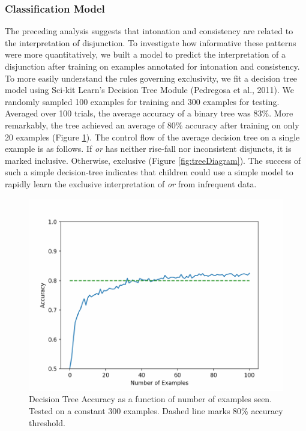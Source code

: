 \documentclass[10pt, letterpaper]{article}
\newenvironment{CodeChunk}{}{}
\begin{document}
\subsubsection{Classification Model}\label{classification-model}

The preceding analysis suggests that intonation and consistency are
related to the interpretation of disjunction. To investigate how
informative these patterns were more quantitatively, we built a model to
predict the interpretation of a disjunction after training on examples
annotated for intonation and consistency. To more easily understand the
rules governing exclusivity, we fit a decision tree model using Sci-kit
Learn's Decision Tree Module (Pedregosa et al., 2011). We randomly
sampled 100 examples for training and 300 examples for testing. Averaged
over 100 trials, the average accuracy of a binary tree was 83\%. More
remarkably, the tree achieved an average of 80\% accuracy after training
on only 20 examples (Figure \ref{fig:learningCurve}). The control flow
of the average decision tree on a single example is as follows. If
\emph{or} has neither rise-fall nor inconsistent disjuncts, it is marked
inclusive. Otherwise, exclusive (Figure \ref{fig:treeDiagram}). The
success of such a simple decision-tree indicates that children could use
a simple model to rapidly learn the exclusive interpretation of
\emph{or} from infrequent data.

\begin{CodeChunk}
\begin{figure}[tb]

{\centering \includegraphics{figs/learningCurve-1} 

}

\caption[Decision Tree Accuracy as a function of number of examples seen]{Decision Tree Accuracy as a function of number of examples seen. Tested on a constant 300 examples. Dashed line marks 80\% accuracy threshold.}\label{fig:learningCurve}
\end{figure}
\end{CodeChunk}
\end{document}
